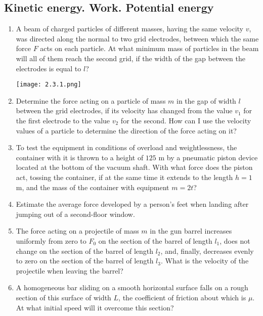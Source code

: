 \documentclass{article}
\begin{document}
\subsection{Kinetic energy. Work. Potential energy}

\begin{enumerate}[label=2.3.\arabic*]


\item A beam of charged particles of different masses, having the same velocity $v$, was directed along the normal to two grid electrodes, between which the same force $F$ acts on each particle. At what minimum mass of particles in the beam will all of them reach the second grid, if the width of the gap between the electrodes is equal to $l$?

\begin{center}
    \texttt{[image: 2.3.1.png]}
\end{center}


\item Determine the force acting on a particle of mass $m$ in the gap of width $l$ between the grid electrodes, if its velocity has changed from the value $v_1$ for the first electrode to the value $v_2$ for the second. How can I use the velocity values of a particle to determine the direction of the force acting on it?

\item To test the equipment in conditions of overload and weightlessness, the container with it is thrown to a height of $125$ m by a pneumatic piston device located at the bottom of the vacuum shaft. With what force does the piston act, tossing the container, if at the same time it extends to the length $h = 1$ m, and the mass of the container with equipment $m = 2t$?

\item Estimate the average force developed by a person's feet when landing after jumping out of a second-floor window.

\item The force acting on a projectile of mass $m$ in the gun barrel increases uniformly from zero to $F_0$ on the section of the barrel of length $l_1$, does not change on the section of the barrel of length $l_2$, and, finally, decreases evenly to zero on the section of the barrel of length $l_3$. What is the velocity of the projectile when leaving the barrel?

\item A homogeneous bar sliding on a smooth horizontal surface falls on a rough section of this surface of width $L$, the coefficient of friction about which is $\mu$. At what initial speed will it overcome this section?


\end{enumerate}
\end{document}
